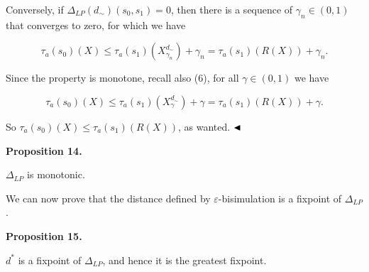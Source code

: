 \documentclass[10pt,a4paper]{article}
\begin{document}
 
 
Conversely, if $\Delta_{LP}(d_{\sim})(s_{0},s_{1})=0$, then there is a sequence of $\gamma_{n}\in(0,1)$ that converges to zero, for which we have\par
  
\par  \quad  \[\tau_{a}(s_{0})(X)\leq\tau_{a}(s_{1})(X^{d_{\sim}}_{\gamma_{n}})+\gamma_{n}=\tau_{a}(s_{1})(R(X))+\gamma_{n}.\]\quad  \quad  
  
Since the property is monotone, recall also (6), for all $\gamma\in(0,1)$ we have\par
  
\par  \quad  \[\tau_{a}(s_{0})(X)\leq\tau_{a}(s_{1})(X^{d_{\sim}}_{\gamma})+\gamma=\tau_{a}(s_{1})(R(X))+\gamma.\]\quad  \quad  
  
So $\tau_{a}(s_{0})(X)\leq\tau_{a}(s_{1})(R(X))$, as wanted. $\hfill\blacktriangleleft$\par
 
 
 
\par\medskip\noindent\textbf{Proposition 14.}\par
 
 
$\Delta_{LP}$ is monotonic.\par
 
 
 
 
We can now prove that the distance defined by $\varepsilon$-bisimulation is a fixpoint of $\Delta_{LP}$.\par
 
 

 
\par\medskip\noindent\textbf{Proposition 15.}\par
 
 
$d^{*}$ is a fixpoint of $\Delta_{LP}$, and hence it is the greatest fixpoint.\par
 
 
\end{document}
